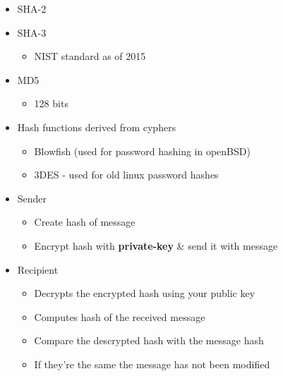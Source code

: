 \documentclass{easyclass}
\begin{document}
    \begin{prf}{}
        \begin{itemize}
            \item SHA-2
            \item SHA-3
            \begin{itemize}
                \item NIST standard as of 2015
            \end{itemize}
            \item MD5
            \begin{itemize}
                \item 128 bits
            \end{itemize}
            \item Hash functions derived from cyphers
            \begin{itemize}
                \item Blowfish (used for password hashing in openBSD)
                \item 3DES - used for old linux password hashes
            \end{itemize}
        \end{itemize}
    \end{prf}
\newpage
    \begin{theo}{}
        \begin{itemize}
            \item Sender
            \begin{itemize}
                \item Create hash of message
                \item Encrypt hash with \textbf{private-key} \& send it with message
            \end{itemize}
            \item Recipient 
            \begin{itemize}
                \item Decrypts the encrypted hash using your public key
                \item Computes hash of the received message
                \item Compare the descrypted hash with the message hash
                \item If they're the same the message has not been modified
            \end{itemize}
        \end{itemize}
    \end{theo}
\end{document}
